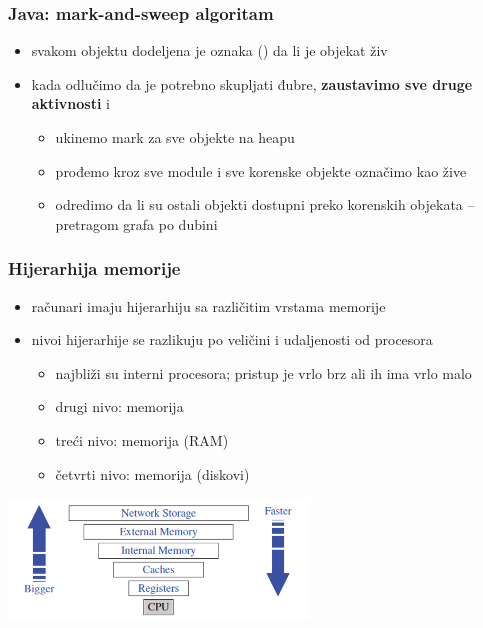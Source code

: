 \documentclass[compress,aspectratio=169]{beamer}
\begin{document}
\begin{frame}[fragile]
  \frametitle{Java: mark-and-sweep algoritam}
  \begin{itemize}
    \item svakom objektu dodeljena je oznaka () da li je
    objekat živ
    \item kada odlučimo da je potrebno skupljati đubre, \textbf{zaustavimo sve
    druge aktivnosti} i 
    \begin{itemize}
      \item ukinemo mark za sve objekte na heapu
      \item prođemo kroz sve module i sve korenske objekte označimo kao žive
      \item odredimo da li su ostali objekti dostupni preko korenskih objekata -- pretragom grafa po dubini
    \end{itemize}
  \end{itemize}
\end{frame}

\begin{frame}[fragile]
  \frametitle{Hijerarhija memorije}
  \begin{itemize}
    \item računari imaju hijerarhiju sa različitim vrstama memorije
    \item nivoi hijerarhije se razlikuju po veličini i udaljenosti od procesora
    \begin{itemize}
      \item najbliži su interni  procesora; pristup je vrlo brz ali ih ima vrlo malo
      \item drugi nivo:  memorija
      \item treći nivo:  memorija (RAM)
      \item četvrti nivo:  memorija (diskovi)
    \end{itemize}
  \end{itemize}
  \begin{center}
    \includegraphics[width=8cm]{asp-15-pic02.png}
  \end{center}
\end{frame}
\end{document}

